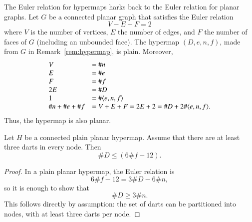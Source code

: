\begin{remark}  The Euler relation for hypermaps harks back
to the Euler relation for planar graphs.
Let $G$ be a connected planar graph that satisfies the
Euler relation
    $$V - E + F = 2$$
where $V$ is the number of vertices, $E$ the number of edges, and
$F$ the number of faces of $G$ (including an unbounded face). The
hypermap $(D,e,n,f)$, made from $G$ in
Remark~\ref{rem:hypermap}, is plain.
Moreover,
    $$\begin{array}{lll}
    V &= \# n\\
    E &= \# e\\
    F &= \# f\\
    2E &= \# D\\
    1 &= \#\langle e,n,f\rangle\\
    \# n + \#e + \# f &= 
    V + E + F = 2 E + 2 = \# D + 2 \#\langle e,n,f\rangle.
    \end{array}
    $$
Thus, the hypermap is also planar. 
\end{remark}


%
%

\begin{lemma}\label{lemma:dart-upper} 
Let $H$ be a connected plain planar hypermap.   Assume that
there are at least three darts in every node.  Then
$$
\# D \le (6 \#f - 12).
$$
\end{lemma}

\begin{proof}  In a plain planar hypermap, the Euler relation is
$$6 \#f - 12 = 3\#D - 6\#n,$$
so it is enough to show that
$$
\# D \ge 3\#n.
$$
This follows directly by assumption: the set of darts can be partitioned into nodes, with at least three darts per node.
\end{proof}

